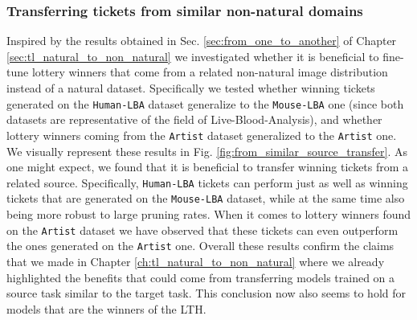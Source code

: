 

\subsubsection{Transferring tickets from similar non-natural domains}
Inspired by the results obtained in Sec. \ref{sec:from_one_to_another} of Chapter \ref{sec:tl_natural_to_non_natural} we investigated whether it is beneficial to fine-tune lottery winners that come from a related non-natural image distribution instead of a natural dataset. Specifically we tested whether winning tickets generated on the \texttt{Human-LBA} dataset generalize to the \texttt{Mouse-LBA} one (since both datasets are representative of the field of Live-Blood-Analysis), and whether lottery winners coming from the \texttt{Artist}  dataset generalized to the \texttt{Artist}  one. We visually represent these results in Fig. \ref{fig:from_similar_source_transfer}. As one might expect, we found that it is beneficial to transfer winning tickets from a related source. Specifically, \texttt{Human-LBA} tickets can perform just as well as winning tickets that are generated on the \texttt{Mouse-LBA} dataset, while at the same time also being more robust to large pruning rates. When it comes to lottery winners found on the \texttt{Artist}  dataset we have observed that these tickets can even outperform the ones generated on the \texttt{Artist}  one. Overall these results confirm the claims that we made in Chapter \ref{ch:tl_natural_to_non_natural} where we already highlighted the benefits that could come from transferring models trained on a source task similar to the target task. This conclusion now also seems to hold for models that are the winners of the LTH. 




